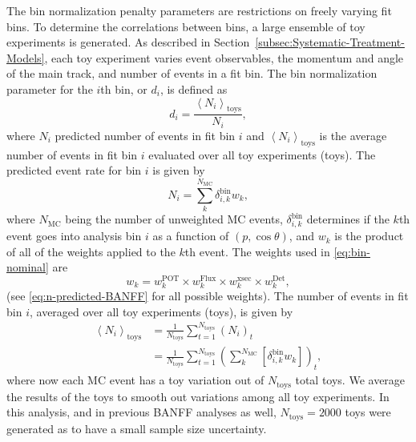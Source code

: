 The bin normalization penalty parameters are restrictions on freely
varying fit bins. To determine the correlations between bins, a large
ensemble of toy experiments is generated. As described in \mbox{Section~\ref{subsec:Systematic-Treatment-Models}},
each toy experiment varies event observables, the momentum and angle
of the main track, and number of events in a fit bin. The bin normalization
parameter for the $i$th bin, or $d_{i}$, is defined as
\begin{equation}
d_{i}=\frac{\left\langle N_{i}\right\rangle _{\text{toys}}}{N_{i}},\label{eq:obsnormdef}
\end{equation}
where $N_{i}$ predicted number of events in fit bin $i$ and $\left\langle N_{i}\right\rangle _{\text{toys}}$
is the average number of events in fit bin $i$ evaluated over all
toy experiments (toys). The predicted event rate for bin $i$ is given
by
\begin{equation}
N_{i}=\sum_{k}^{N_{\text{MC}}}\delta_{i,k}^{\text{bin}}w_{k},\label{eq:bin-nominal}
\end{equation}
where $N_{\text{MC}}$ being the number of unweighted MC events, $\delta_{i,k}^{\text{bin}}$
determines if the $k$th event goes into analysis bin $i$ as a function
of $\left(p,\cos\theta\right)$, and $w_{k}$ is the product of all
of the weights applied to the $k$th event. The weights used in \eqref{eq:bin-nominal}
are 
\begin{equation}
w_{k}=w_{k}^{\text{POT}}\times w_{k}^{\text{Flux}}\times w_{k}^{\text{xsec}}\times w_{k}^{\text{Det}},\label{eq:EventWeights}
\end{equation}
(see \eqref{eq:n-predicted-BANFF} for all possible weights). The
number of events in fit bin $i$, averaged over all toy experiments
(toys), is given by 
\begin{equation}
\begin{aligned}\left\langle N_{i}\right\rangle _{\text{toys}} & =\frac{1}{N_{\text{toys}}}\sum_{t=1}^{N_{\text{toys}}}\left(N_{i}\right)_{t}\\
 & =\frac{1}{N_{\text{toys}}}\sum_{t=1}^{N_{\text{toys}}}\left(\sum_{k}^{N_{\text{MC}}}\left[\delta_{i,k}^{\text{bin}}w_{k}\right]\right)_{t},
\end{aligned}
\label{eq:NAvgToys}
\end{equation}
where now each MC event has a toy variation out of $N_{\text{toys}}$
total toys. We average the results of the toys to smooth out variations
among all toy experiments. In this analysis, and in previous BANFF
analyses as well, $N_{\text{toys}}=2000$ toys were generated as to
have a small sample size uncertainty.

